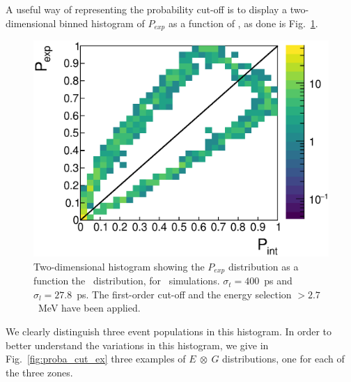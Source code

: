 A useful way of representing the probability cut-off is to display a two-dimensional binned histogram of $P_{exp}$ as a function of \Pint, as done is Fig.~\ref{fig:biplot_Pexp_Pint}.
\begin{figure}[!h]
  \centering
  \includegraphics[width=15cm]{timedifference/fig_timediff/PintVSPexp_208Tl.eps}
  \caption{Two-dimensional histogram showing the $P_{exp}$ distribution as a function the \Pint\ distribution, for \Tl\ simulations.
    $\sigma_{t}=400$~ps and $\sigma_{l}=27.8$~ps.
    The first-order cut-off and the energy selection $>2.7$~MeV have been applied.
    \label{fig:biplot_Pexp_Pint}}
\end{figure}
We clearly distinguish three event populations in this histogram.
In order to better understand the variations in this histogram, we give in Fig.~\ref{fig:proba_cut_ex} three examples of $E~\otimes~G$ distributions, one for each of the three zones.
